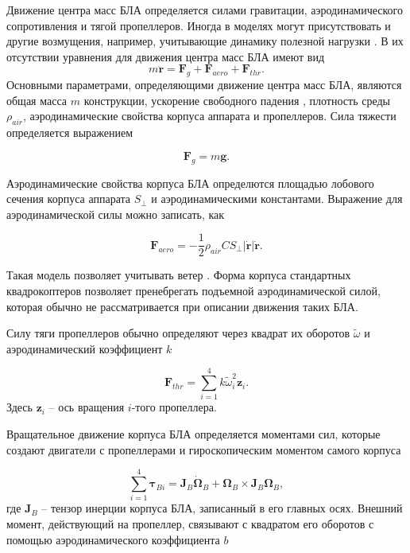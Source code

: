 Движение центра масс БЛА определяется силами гравитации, аэродинамического сопротивления и тягой пропеллеров.
Иногда в моделях могут присутствовать и другие возмущения, например, учитывающие динамику полезной нагрузки \cite{Lim01}.
В их отсутствии уравнения для движения центра масс БЛА имеют вид
\begin{equation} \label{eq:common_traslational_motion}
m \ddot{\bm{r}} = \bm{F}_g + \bm{F}_{aero} + \bm{F}_{thr}.
\end{equation}
Основными параметрами, определяющими движение центра масс БЛА, являются общая масса {$m$} конструкции, ускорение свободного падения , плотность среды {$\rho_{air}$}, аэродинамические свойства корпуса аппарата и пропеллеров. Сила тяжести определяется выражением

\begin{equation} \label{eq:gravity_force}
\bm{F}_g = m\bm{g}.
\end{equation}

Аэродинамические свойства корпуса БЛА определются площадью лобового сечения корпуса аппарата {$S_{\perp}$} и аэродинамическими константами. Выражение для аэродинамической силы можно записать, как \cite{Biard01}

\begin{equation} \label{eq:aerodynamic_force}
\bm{F}_{aero} = - \frac{1}{2} \rho_{air} C S_{\perp} |\dot{\bm{r}}| \dot{\bm{r}}.
\end{equation}

Такая модель позволяет учитывать ветер \cite{Bannwarth01}. Форма корпуса стандартных квадрокоптеров позволяет пренебрегать подъемной аэродинамической силой, которая обычно не рассматривается при описании движения таких БЛА.

Силу тяги пропеллеров обычно определяют через квадрат их оборотов $\tilde\omega$ и аэродинамический коэффициент $k$ \cite{Falconi01}

\begin{equation} \label{eq:thrust_force}
\bm{F}_{thr} = \sum_{i=1}^{4}{ { k \tilde\omega^2_i \bm{z}_i}.}
\end{equation}
Здесь $\bm{z}_i$ -- ось вращения $i$-того пропеллера.
 
Вращательное движение корпуса БЛА определяется моментами сил, которые создают двигатели с пропеллерами и гироскопическим моментом самого корпуса

\begin{equation} \label{eq:common_rotational_motion}
\sum_{i=1}^{4}{\bm{\tau}_{Bi}} = \bm{J}_B\dot{\bm{\Omega}}_B + \bm{\Omega}_B \times  \bm{J}_B{\bm{\Omega}_B},
\end{equation}
где $\bm{J}_B$ -- тензор инерции корпуса БЛА, записанный в его главных осях.
Внешний момент, действующий на пропеллер, связывают с квадратом его оборотов с помощью аэродинамического коэффициента $b$ \cite{Ryll01}

